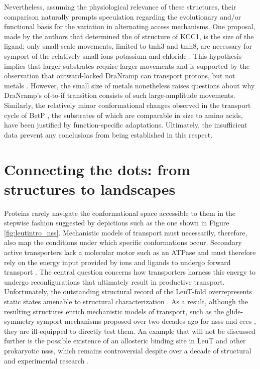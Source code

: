 Nevertheless, assuming the physiological relevance of these structures, their comparison naturally prompts speculation regarding the evolutionary and/or functional basis for the variation in alternating access mechanisms. One proposal, made by the authors that determined the \gls{of} structure of KCC1, is the size of the ligand; only small-scale movements, limited to \gls{tmh}3 and \gls{tmh}8, are necessary for symport of the relatively small ions potassium and chloride \citep*{Zhao2020}. This hypothesis implies that larger substrates require larger movements and is supported by the observation that outward-locked DraNramp can transport protons, but not metals \citep*{Bozzi2019}. However, the small size of metals nonetheless raises questions about why DraNramp's \gls{of}-to-\gls{if} transition consists of such large-amplitude movements. Similarly, the relatively minor conformational changes observed in the transport cycle of BetP \citep*{Perez2012}, the substrates of which are comparable in size to amino acids, have been justified by function-specific adaptations. Ultimately, the insufficient data prevent any conclusions from being established in this respect.

\section{Connecting the dots: from structures to landscapes}

Proteins rarely navigate the conformational space accessible to them in the stepwise fashion suggested by depictions such as the one shown in Figure \ref{fig:leutintro_nss}. Mechanistic models of transport must necessarily, therefore, also map the conditions under which specific conformations occur. Secondary active transporters lack a molecular motor such as an ATPase and must therefore rely on the energy input provided by ions and ligands to undergo forward transport \citep*{Boudker2010}. The central question concerns how transporters harness this energy to undergo reconfigurations that ultimately result in productive transport. Unfortunately, the outstanding structural record of the LeuT-fold overrepresents static states amenable to structural characterization \citep*{Mullen2016, Tsai2010}. As a result, although the resulting structures enrich mechanistic models of transport, such as the glide-symmetry symport mechanisms proposed over two decades ago for \gls{nss}s \citep*{Rudnick2006} and \gls{ccc}s \citep*{Russell2000}, they are ill-equipped to directly test them. An example that will not be discussed further is the possible existence of an allosteric binding site in LeuT and other prokaryotic \gls{nss}s, which remains controversial despite over a decade of structural and experimental research \citep*{Fitzgerald2019, LeVine2019, Merkle2018, Piscitelli2010, Quick2009, Quick2012, Shi2010, Tavoulari2011}.

